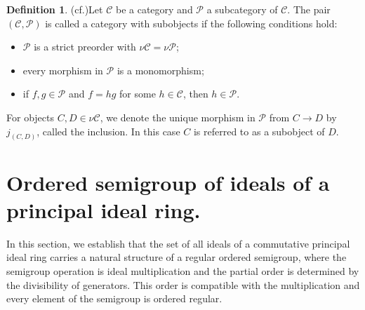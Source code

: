 \documentclass[12pt,a4paper]{amsart}
\theoremstyle{plain}
\theoremstyle{definition}
\newtheorem{definition}[theorem]{Definition}
\begin{document}
\begin{definition}(cf.\cite{kss})\label{suboject}
	Let $\mathcal{C}$ be a category and $\mathcal{P}$ a subcategory of $\mathcal{C}$.
	The pair $(\mathcal{C}, \mathcal{P})$ is called a category with subobjects
	if the following conditions hold:
	\begin{itemize}
		\item $\mathcal{P}$ is a strict preorder with $\nu\mathcal{C} = \nu\mathcal{P}$;
		\item every morphism in $\mathcal{P}$ is a monomorphism;
		\item if $f, g \in \mathcal{P}$ and $f =  hg $ for some $h \in \mathcal{C}$,
		then $h \in \mathcal{P}$.
	\end{itemize}
	For objects $C, D \in \nu\mathcal{C}$, we denote the unique morphism in
	$\mathcal{P}$ from $C \to D$ by $j_{(C, D)}$, called the inclusion.
	In this case $C$ is referred to as a subobject of $D$.
	
\end{definition}

\section{Ordered semigroup of ideals of a principal ideal ring.}\label{section}

In this section, we establish that the set of all ideals of a commutative principal ideal ring carries a natural structure of a regular ordered semigroup, where the semigroup operation is ideal multiplication and the partial order is determined by the divisibility of generators. This order is compatible with the multiplication and every element of the semigroup is ordered regular.
\end{document}
